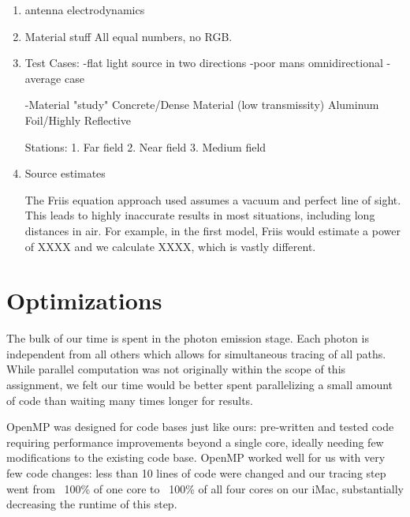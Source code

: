 \documentclass[%
        final,
        notitlepage,
        narroweqnarray,
        inline,
        twoside,
        ]{ieee}
\begin{document}
\begin{enumerate}

\item antenna electrodynamics

\item Material stuff
All equal numbers, no RGB.

\item Test Cases:
-flat light source in two directions
-poor mans omnidirectional
-average case 

-Material "study"
Concrete/Dense Material (low transmissity)
Aluminum Foil/Highly Reflective

Stations:
1. Far field
2. Near field
3. Medium field

\item Source estimates

The Friis equation approach used assumes a vacuum and perfect line of sight.
This leads to highly inaccurate results in most situations, including long
distances in air. For example, in the first model, Friis would estimate a power of XXXX
and we calculate XXXX, which is vastly different. 

\end{enumerate}


\section{Optimizations}
The bulk of our time is spent in the photon emission stage.  Each photon is
independent from all others which allows for simultaneous tracing of all
paths.  While parallel computation was not originally within the scope of this
assignment, we felt our time would be better spent parallelizing a small amount
of code than waiting many times longer for results.

OpenMP \cite{Grama} was designed for code bases just like ours: pre-written and
tested code requiring performance improvements beyond a single core, ideally
needing few modifications to the existing code base.  OpenMP worked well for
us with very few code changes: less than 10 lines of code were changed and
our tracing step went from ~100\% of one core to ~100\% of all four cores on
our iMac, substantially decreasing the runtime of this step.
\end{document}
